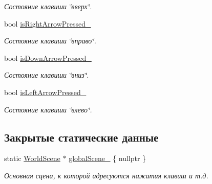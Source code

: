 \begin{DoxyCompactItemize}
\begin{DoxyCompactList}\small\item\em Состояние клавиши \char`\"{}вверх\char`\"{}. \end{DoxyCompactList}\item 
\mbox{\label{classrtm_1_1_world_scene_a942b2bc8976c5c1949276094fc6d8b6b}} 
bool \hyperlink{classrtm_1_1_world_scene_a942b2bc8976c5c1949276094fc6d8b6b}{is\+Right\+Arrow\+Pressed\+\_\+}
\begin{DoxyCompactList}\small\item\em Состояние клавиши \char`\"{}вправо\char`\"{}. \end{DoxyCompactList}\item 
\mbox{\label{classrtm_1_1_world_scene_ac097c2d7ff22ce8b847056e3c223a3d6}} 
bool \hyperlink{classrtm_1_1_world_scene_ac097c2d7ff22ce8b847056e3c223a3d6}{is\+Down\+Arrow\+Pressed\+\_\+}
\begin{DoxyCompactList}\small\item\em Состояние клавиши \char`\"{}вниз\char`\"{}. \end{DoxyCompactList}\item 
\mbox{\label{classrtm_1_1_world_scene_a882b28aedc636ebc33c8382bbd72a649}} 
bool \hyperlink{classrtm_1_1_world_scene_a882b28aedc636ebc33c8382bbd72a649}{is\+Left\+Arrow\+Pressed\+\_\+}
\begin{DoxyCompactList}\small\item\em Состояние клавиши \char`\"{}влево\char`\"{}. \end{DoxyCompactList}\end{DoxyCompactItemize}
\subsection*{Закрытые статические данные}
\begin{DoxyCompactItemize}
\item 
\mbox{\label{classrtm_1_1_world_scene_a166aa392d36d52da9e5788ab0d0db0ee}} 
static \hyperlink{classrtm_1_1_world_scene}{World\+Scene} $\ast$ \hyperlink{classrtm_1_1_world_scene_a166aa392d36d52da9e5788ab0d0db0ee}{global\+Scene\+\_\+} \{ nullptr \}
\begin{DoxyCompactList}\small\item\em Основная сцена, к которой адресуются нажатия клавиш и т.\+д. \end{DoxyCompactList}\end{DoxyCompactItemize}


